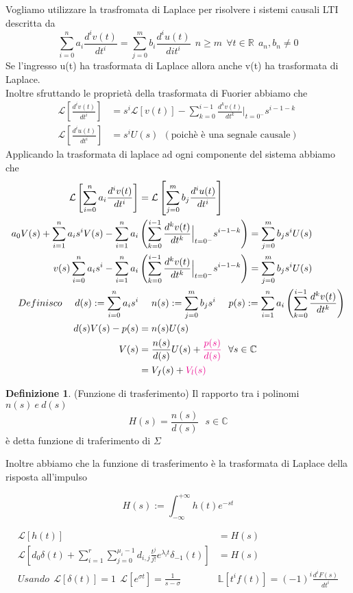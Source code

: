 \documentclass{article}
\theoremstyle{definition}
\newtheorem*{definizione}{Definizione}
\newcommand{\R}{\mathbb{R}}
\newcommand{\la}{\lambda}
\newcommand{\intinf}{\int_{-\infty}^{+\infty}}
\newcommand{\sistema}{\sum_{i=0}^{n}a_i \frac{d^i v(t)}{dt^i}=\sum_{j=0}^{m}b_i \frac{d^i u(t)}{dit^i}}
\begin{document}
	Vogliamo utilizzare la trasfromata di Laplace per risolvere i sistemi causali LTI descritta da 
	$$\sistema \ \ n \geq m \ \ \forall t \in \R \ \ a_n , b_n \neq 0$$
	Se l'ingresso u(t) ha trasformata di Laplace allora anche v(t) ha trasformata di Laplace.\\ Inoltre sfruttando le proprietà della trasformata di Fuorier abbiamo che 
	\begin{align*}
	\mathcal{L}\left[\frac{d^iv(t)}{dt^i}\right]&=s^i \mathcal{L}[v(t)] - \sum_{k=0}^{i-1}\frac{d^kv(t)}{dt^k} \Big|_{t=0^-} s^{i-1-k} \\ 
	\mathcal{L}\left[\frac{d^iu(t)}{dt^i}\right]&=s^i U(s) \ \ (\text{poichè è una segnale causale})
		\end{align*}
		Applicando la trasformata di laplace ad ogni componente del sistema abbiamo che 
		\begin{align*}
			\mathcal{L}\left[\sum_{i=0}^{n}a_i \frac{d^i v(t)}{dt^i} \right]&=\mathcal{L}\left[\sum_{j=0}^{m}b_j \frac{d^iu(t)}{dt^i} \right] \\
			a_0 V(s) + \sum_{i=1}^{n}a_i s^i V(s) - \sum_{i=1}^{n}a_i&\left(\sum_{k=0}^{i-1}\frac{d^kv(t)}{dt^k} \Big|_{t=0^-} s^{i-1-k}\right)= \sum_{j=0}^{m}b_j s^i U(s) \\
			v(s)\sum_{i=0}^{n}a_i s^i  - \sum_{i=1}^{n}a_i&\left(\sum_{k=0}^{i-1}\frac{d^kv(t)}{dt^k} \Big|_{t=0^-} s^{i-1-k}\right)= \sum_{j=0}^{m}b_j s^i U(s) \\ 
			 Definisco \ \ \ \ d(s) := \sum_{i=0}^{n}a_i s^i  & \ \ \ \ n(s):= \sum_{j=0}^{m}b_j s^i \ \ \ \ p(s):= \sum_{i=1}^{n}a_i\left(\sum_{k=0}^{i-1}\frac{d^kv(t)}{dt^k}\right) \\
		  d(s) V(s)-p(s)&=n(s)U(s) \\
		 V(s)&=\frac{n(s)}{d(s)}U(s) + \textcolor{magenta}{\frac{p(s)}{d(s)} }\ \ \forall s \in \mathbb{C}  \\
		 &= V_f(s)+ \textcolor{magenta}{V_l(s)}
		\end{align*}
		\begin{definizione}(Funzione di trasferimento)
			Il rapporto tra i polinomi $n(s) \ e \ d(s)$ 
			$$H(s) = \frac{n(s)}{d(s)} \ \ \ s \in \mathbb{C} $$ \label{formu:1}
			è detta funzione di traferimento di $\Sigma$
		\end{definizione}
		Inoltre abbiamo che la funzione di trasferimento è la trasformata di Laplace della risposta all'impulso 
		\begin{tcolorbox}
$$H(s):=\intinf h(t)e^{-st}$$ 
		\end{tcolorbox}
		\begin{align*}
		\mathcal{L}[h(t)]&=H(s) \\ 
		\mathcal{L}\left[d_0 \delta(t)+\sum_{i=1}^{r}\sum_{j=0}^{\mu_i-1}d_{i,j}\frac{t^j}{j!}e^{\la_i t}\delta_{-1}(t)\right]&=H(s) \\  
		Usando  \ \ \mathcal{L}[\delta(t)]=1 \ \ \mathcal{L}[e^{\sigma t}]=\frac{1}{s-\sigma }\ \ & \mathbb{L}[t^if(t)]=(-1)^i \frac{d^iF(s)}{dt^i}\\ 
		\end{align*}
\end{document}
